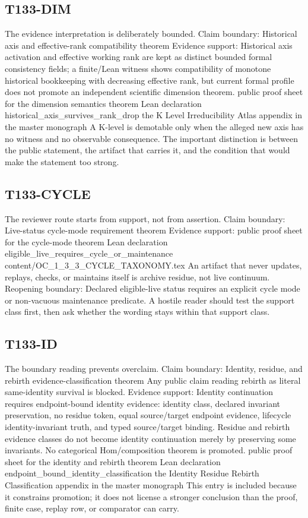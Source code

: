 \subsection{T133-DIM}
The evidence interpretation is deliberately bounded. Claim boundary: Historical axis and effective-rank compatibility theorem Evidence support: Historical axis activation and effective working rank are kept as distinct bounded formal consistency fields; a finite/Lean witness shows compatibility of monotone historical bookkeeping with decreasing effective rank, but current formal profile does not promote an independent scientific dimension theorem. public proof sheet for the dimension semantics theorem Lean declaration historical\_axis\_survives\_rank\_drop the K Level Irreducibility Atlas appendix in the master monograph A K-level is demotable only when the alleged new axis has no witness and no observable consequence. The important distinction is between the public statement, the artifact that carries it, and the condition that would make the statement too strong.

\subsection{T133-CYCLE}
The reviewer route starts from support, not from assertion. Claim boundary: Live-status cycle-mode requirement theorem Evidence support: public proof sheet for the cycle-mode theorem Lean declaration eligible\_live\_requires\_cycle\_or\_maintenance content/OC\_1\_3\_3\_CYCLE\_TAXONOMY.tex An artifact that never updates, replays, checks, or maintains itself is archive residue, not live continuum. Reopening boundary: Declared eligible-live status requires an explicit cycle mode or non-vacuous maintenance predicate. A hostile reader should test the support class first, then ask whether the wording stays within that support class.

\subsection{T133-ID}
The boundary reading prevents overclaim. Claim boundary: Identity, residue, and rebirth evidence-classification theorem Any public claim reading rebirth as literal same-identity survival is blocked. Evidence support: Identity continuation requires endpoint-bound identity evidence: identity class, declared invariant preservation, no residue token, equal source/target endpoint evidence, lifecycle identity-invariant truth, and typed source/target binding. Residue and rebirth evidence classes do not become identity continuation merely by preserving some invariants. No categorical Hom/composition theorem is promoted. public proof sheet for the identity and rebirth theorem Lean declaration endpoint\_bound\_identity\_classification the Identity Residue Rebirth Classification appendix in the master monograph This entry is included because it constrains promotion; it does not license a stronger conclusion than the proof, finite case, replay row, or comparator can carry.

